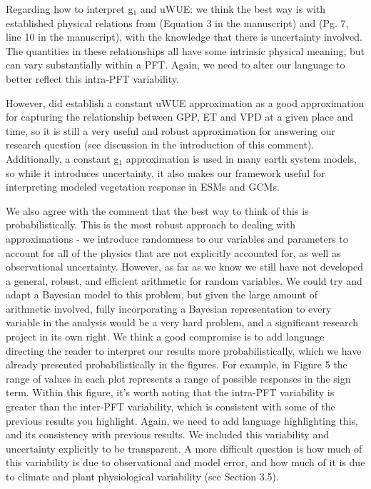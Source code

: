 \documentclass[12pt]{article}
\begin{document}
Regarding how to interpret g$_1$ and uWUE: we think the best way
is with established physical relations from \cite{MEDLYN_2011}
(Equation 3 in the manuscript) and \cite{Zhou_2014} (Pg. 7, line 10 in
the manuscript), with the knowledge that there is uncertainty
involved. The quantities in these relationships all have some
intrinsic physical meaning, but can vary substantially within a
PFT. Again, we need to alter our language to better reflect this
intra-PFT variability.

However, \cite{Zhou_2014} did establish a constant uWUE approximation
as a good approximation for capturing the relationship between GPP, ET
and VPD at a given place and time, so it is still a very useful and
robust approximation for answering our research question (see
discussion in the introduction of this comment). Additionally, a constant g$_1$
approximation is used in many earth system models, so while it
introduces uncertainty, it also makes our framework useful for
interpreting modeled vegetation response in ESMs and GCMs.

We also agree with the comment that the best way to think of this is
probabilistically. This is the most robust approach to dealing with
approximations - we introduce randomness to our variables and
parameters to account for all of the physics that are not explicitly
accounted for, as well as observational uncertainty. However, as far
as we know we still have not developed a general, robust, and efficient
arithmetic for random variables. We could try and adapt a Bayesian
model to this problem, but given the large amount of arithmetic
involved, fully incorporating a Bayesian representation to every
variable in the analysis would be a very hard problem, and a
significant research project in its own right. We think a good
compromise is to add language directing the reader to interpret our
results more probabilistically, which we have already presented
probabilistically in the figures. For example, in Figure 5 the range of
values in each plot represents a range of possible responses in the
sign term. Within this figure, it's worth noting that the intra-PFT
variability is greater than the inter-PFT variability, which is
consistent with some of the previous results you highlight. Again, we
need to add language highlighting this, and its consistency with
previous results. We included this variability and uncertainty
explicitly to be transparent. A more difficult question is how much of
this variability is due to observational and model error, and how much
of it is due to climate and plant physiological variability (see
Section 3.5).
\end{document}
